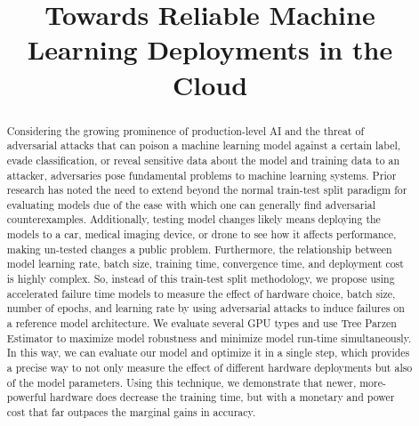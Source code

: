 \documentclass[conference]{IEEEtran}
\begin{document}
\title{Towards Reliable Machine Learning Deployments in the Cloud}
\author{
\and
{}
\and
{}
\and
{}
}

\maketitle

\begin{abstract}
Considering the growing prominence of production-level AI and the threat of adversarial attacks that can poison a machine learning model against a certain label, evade classification, or reveal sensitive data about the model and training data to an attacker, adversaries pose fundamental problems to machine learning systems. Prior research has noted the need to extend beyond the normal train-test split paradigm for evaluating models due of the ease with which one can generally find adversarial counterexamples. Additionally, testing model changes likely means deploying the models to a car, medical imaging device, or drone to see how it affects performance, making un-tested changes a public problem. Furthermore, the relationship between model learning rate, batch size, training time, convergence time, and deployment cost is highly complex. So, instead of this train-test split methodology, we propose using accelerated failure time models to measure the effect of hardware choice, batch size, number of epochs, and learning rate by using adversarial attacks to induce failures on a reference model architecture. We evaluate several GPU types and use Tree Parzen Estimator to maximize model robustness and minimize model run-time simultaneously. In this way, we can evaluate our model and optimize it in a single step, which provides a precise way to not only measure the effect of different hardware deployments but also of the model parameters. Using this technique, we demonstrate that newer, more-powerful hardware does decrease the training time, but with a monetary and power cost that far outpaces the marginal gains in accuracy.
\end{abstract}
\end{document}
